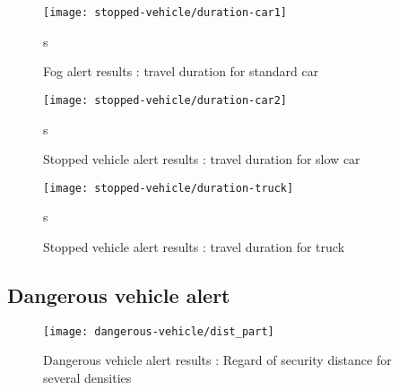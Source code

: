 \documentclass[a4paper,10pt]{report}
\begin{document}
\begin{figure}
    \begin{center}
         \texttt{[image: stopped-vehicle/duration-car1]}
    \end{center}s
  \caption{ Fog alert results : travel duration for standard car}
  \label{fig:ttc_part}
\end{figure}


\begin{figure}
    \begin{center}
         \texttt{[image: stopped-vehicle/duration-car2]}
    \end{center}s
  \caption{ Stopped vehicle alert results : travel duration for slow car}
  \label{fig:ttc_part}
\end{figure}


\begin{figure}
    \begin{center}
         \texttt{[image: stopped-vehicle/duration-truck]}
    \end{center}s
  \caption{ Stopped vehicle alert results : travel duration for truck}
  \label{fig:ttc_part}
\end{figure}


\subsection{Dangerous vehicle alert}

\begin{figure}
    \begin{center}
         \texttt{[image: dangerous-vehicle/dist\_part]}
    \end{center}
  \caption{ Dangerous vehicle alert results : Regard of security distance for several densities }
  \label{fig:ttc_part}
\end{figure}
\end{document}
